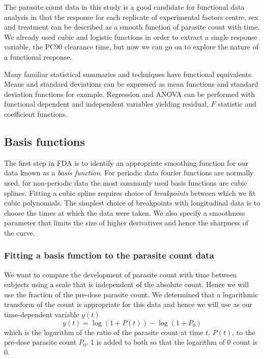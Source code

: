 The parasite count data in this study is a good candidate for functional data analysis in that the response for each replicate of experimental factors centre, sex and treatment can be described as a smooth function of parasite count with time. We already used cubic and logistic functions in order to extract a single response variable, the PC90 clearance time, but now we can go on to explore the nature of a functional response.

Many familiar statistical summaries and techniques have functional equivalents. Means and standard deviations can be expressed as mean functions and standard deviation functions for example. Regression and ANOVA can be performed with functional dependent and independent variables yielding residual, $F$ statistic and coefficient functions.
\subsection{Basis functions}
The first step in FDA is to identify an appropriate smoothing function for our data known as a \emph{basis function}. For periodic data fourier functions are normally used, for non-periodic data the most commonly used basis functions are cubic splines\cite{fdaweb}. Fitting a cubic spline requires choice of \emph{breakpoints} between which we fit cubic polynomials. The simplest choice of breakpoints with longitudinal data is to choose the times at which the data were taken. We also specify a smoothness parameter that limits the size of higher derivatives and hence the sharpness of the curve.

\subsubsection*{Fitting a basis function to the parasite count data}

We want to compare the development of parasite count with time between subjects using a scale that is independent of the absolute count. Hence we will use the fraction of the pre-dose parasite count. We determined that a logarithmic transform of the count is appropriate for this data and hence we will use as our time-dependent variable $y(t)$
$$y(t)=\log (1+P(t))-\log(1+P_{0})$$
which is the logarithm of the ratio of the parasite count at time $t$, $P(t)$, to the pre-dose parasite count $P_{0}$. 1 is added to both so that the logarithm of 0 count is 0.


